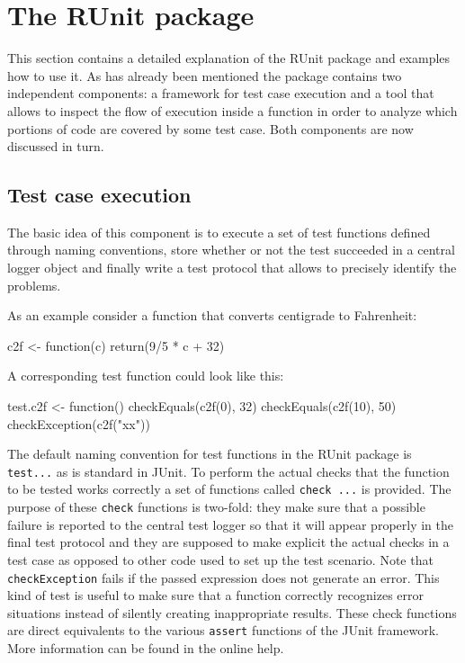 \documentclass[12pt, a4paper]{article}
\begin{document}
\section{The RUnit package}
\label{section:RUnitPackage}
This section contains a detailed explanation of the RUnit package and
examples how to use it. As has already been mentioned the package
contains two independent components: a framework for test case
execution and a tool that allows to inspect the flow of execution
inside a function in order to analyze which portions of code are
covered by some test case.
Both components are now discussed in turn.

\subsection{Test case execution}
\label{subsection:Testcaseexecution}
The basic idea of this component is to execute a set of test functions
defined through naming conventions, store whether or not the test
succeeded in a central logger object and finally write a test protocol
that allows to precisely identify the problems.

As an example consider a function that converts centigrade to
Fahrenheit:
\begin{Sinput}
c2f <- function(c) return(9/5 * c + 32)
\end{Sinput}
A corresponding test function could look like this:
\begin{Sinput}
test.c2f <- function() {
  checkEquals(c2f(0), 32)
  checkEquals(c2f(10), 50)
  checkException(c2f("xx"))
}
\end{Sinput}
The default naming convention for test functions in the RUnit package is {\tt test...} as is standard in JUnit. To perform the actual checks that the function to be tested works correctly a set of functions called {\tt check ...} is provided. The purpose of these {\tt check} functions is two-fold: they make sure that a possible failure is reported to the central test logger so that it will appear properly in the final test protocol and they are supposed to make explicit the actual checks in a test case as opposed to other code used to set up the test scenario. Note that {\tt checkException} fails if the passed expression does not generate an error. This kind of test is useful to make sure that a function correctly recognizes error situations instead of silently creating inappropriate results. These check functions are direct equivalents to the various {\tt assert} functions of the JUnit framework. More information can be found in the online help.
\end{document}
